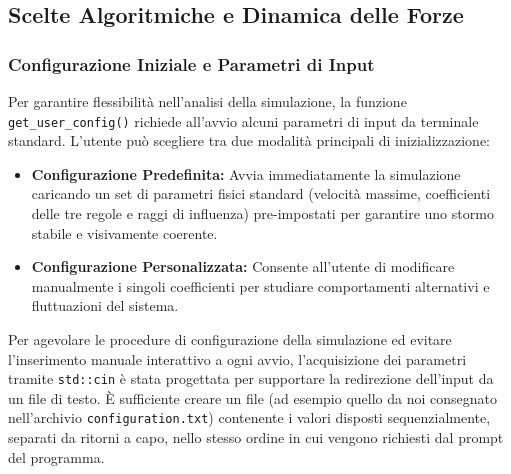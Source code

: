 \documentclass[11pt, a4paper]{article}
\begin{document}
\subsection{Scelte Algoritmiche e Dinamica delle Forze}
\subsubsection{Configurazione Iniziale e Parametri di Input}
Per garantire flessibilità nell'analisi della simulazione, la funzione \texttt{get\_user\_config()} richiede all'avvio alcuni parametri di input da terminale standard. L'utente può scegliere tra due modalità principali di inizializzazione:
\begin{itemize}
    \item \textbf{Configurazione Predefinita:} Avvia immediatamente la simulazione caricando un set di parametri fisici standard (velocità massime, coefficienti delle tre regole e raggi di influenza) pre-impostati per garantire uno stormo stabile e visivamente coerente.
    \item \textbf{Configurazione Personalizzata:} Consente all'utente di modificare manualmente i singoli coefficienti per studiare comportamenti alternativi e fluttuazioni del sistema.
\end{itemize}
Per agevolare le procedure di configurazione della simulazione ed evitare l'inserimento manuale interattivo a ogni avvio, l'acquisizione dei parametri tramite \texttt{std::cin} è stata progettata per supportare la redirezione dell'input da un file di testo. È sufficiente creare un file (ad esempio quello da noi consegnato nell'archivio \texttt{configuration.txt}) contenente i valori disposti sequenzialmente, separati da ritorni a capo, nello stesso ordine in cui vengono richiesti dal prompt del programma.
\end{document}
